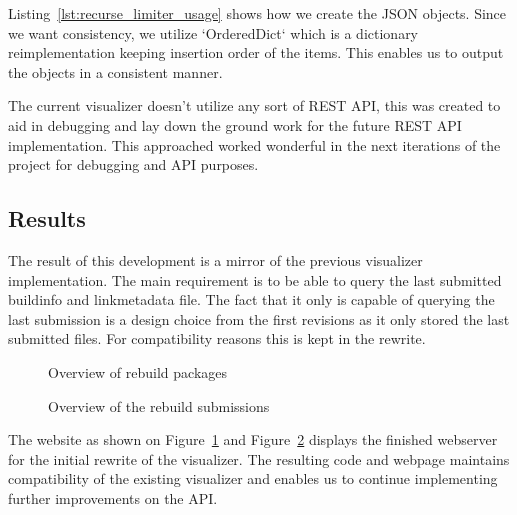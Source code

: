 \documentclass[../Main/thesis.tex]{subfiles}
\begin{document}
Listing~\ref{lst:recurse_limiter_usage} shows how we create the JSON objects.
Since we want consistency, we utilize `OrderedDict` which is a dictionary
reimplementation keeping insertion order of the items. This enables us to output
the objects in a consistent manner.

The current visualizer doesn't utilize any sort of REST API, this was created to
aid in debugging and lay down the ground work for the future REST API
implementation. This approached worked wonderful in the next iterations of the
project for debugging and API purposes.


\subsection*{Results}%
\label{sub:first_iteration_results}

The result of this development is a mirror of the previous visualizer
implementation. The main requirement is to be able to query the last submitted
buildinfo and linkmetadata file. The fact that it only is capable of querying
the last submission is a design choice from the first revisions as it only
stored the last submitted files. For compatibility reasons this is kept in the
rewrite.

\begin{figure}[H]
\caption{Overview of rebuild packages}%
\label{fig:rebuild-overview} 
\end{figure}

\begin{figure}[H]
\caption{Overview of the rebuild submissions}%
\label{fig:submission-overview} 
\end{figure}

The website as shown on Figure~\ref{fig:rebuild-overview} and
Figure~\ref{fig:submission-overview} displays the finished webserver for the
initial rewrite of the visualizer. The resulting code and webpage maintains
compatibility of the existing visualizer and enables us to continue implementing
further improvements on the API.
\end{document}

